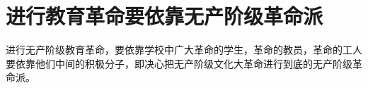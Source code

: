 \section[进行教育革命要依靠无产阶级革命派（一九六七年十月二十五日）]{进行教育革命要依靠无产阶级革命派}


进行无产阶级教育革命，要依靠学校中广大革命的学生，革命的教员，革命的工人要依靠他们中间的积极分子，即决心把无产阶级文化大革命进行到底的无产阶级革命派。




